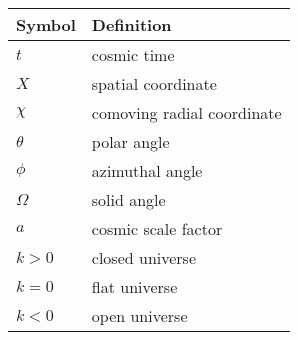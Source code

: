 \begin{tabular}{ll}
 \toprule
  Symbol & Definition \\
 \midrule
 \midrule
  \(t\) & cosmic time \\
  \(X\) & spatial coordinate \\
  \(\chi\) & comoving radial coordinate \\
  \(\theta\) & polar angle \\
  \(\phi\) & azimuthal angle \\
  \(\Omega\) & solid angle \\
  \(a\) & cosmic scale factor \\
  \(k>0\) & closed universe \\
  \(k=0\) & flat universe \\
  \(k<0\) & open universe \\
 \bottomrule
\end{tabular}
